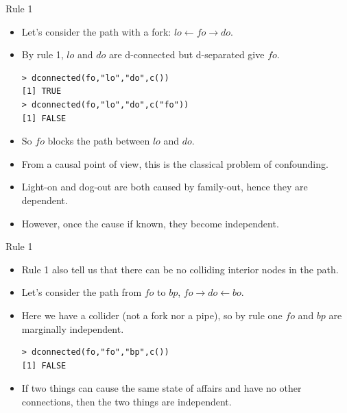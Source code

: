 \documentclass[handout]{beamer}
\begin{document}
\begin{frame}[fragile]{Rule 1}
\scriptsize{
\begin{itemize}

\item Let's consider the path with a fork: $lo \leftarrow fo \rightarrow do$.

\item By rule 1, $lo$ and $do$ are d-connected but d-separated give $fo$.

\begin{verbatim}
> dconnected(fo,"lo","do",c()) 
[1] TRUE
> dconnected(fo,"lo","do",c("fo")) 
[1] FALSE
\end{verbatim}


\item So $fo$ blocks the path between $lo$ and $do$.

\item From a causal point of view, this is the classical problem of confounding.

\item Light-on and dog-out are both caused by family-out, hence they are dependent.

\item However, once the cause if known, they become independent.





\end{itemize}

} 

\end{frame}


\begin{frame}[fragile]{Rule 1}
\scriptsize{
\begin{itemize}

\item Rule 1 also tell us that there can be no colliding interior nodes in the path.

\item Let's consider the path from $fo$ to $bp$, $fo \rightarrow do \leftarrow bo$.

\item Here we have a collider (not a fork nor a pipe), so by rule one $fo$ and $bp$ are marginally independent.

\begin{verbatim}
> dconnected(fo,"fo","bp",c())
[1] FALSE 
\end{verbatim}



\item If two things can cause the same state of affairs and have no other connections, then the two things are independent.




\end{itemize}

} 

\end{frame}
\end{document}
